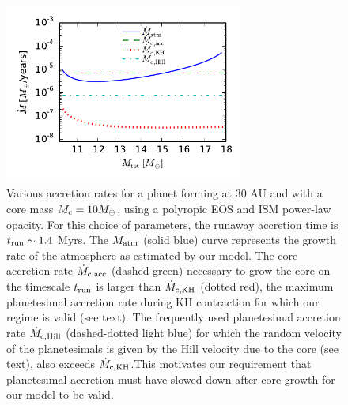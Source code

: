  \begin{figure}[H]
\centering
\includegraphics[width=0.7\textwidth]{figures/acc_rates_paper.pdf}
\caption{Various accretion rates for a planet forming at 30 AU and with a core mass $M_{\rm c}=10 M_{\oplus}$, using a polyropic EOS and ISM power-law opacity. For this choice of parameters, the runaway accretion time is $t_{\rm run} \sim 1.4$ Myrs. The $\dot{M}_{\rm{atm}}$ (solid blue) curve represents the growth rate of the atmosphere as estimated by our model. The core accretion rate $\dot{M}_{\rm c, acc}$ (dashed green) necessary to grow the core on the timescale $t_{\rm run}$ is larger than $\dot{M}_{\rm c, KH}$ (dotted red), the maximum planetesimal accretion rate during KH contraction for which our regime is valid (see text). The frequently used planetesimal accretion rate $\dot{M}_{\rm c, Hill}$ (dashed-dotted light blue) for which the random velocity of the planetesimals is given by the Hill velocity due to the core (see text), also exceeds $\dot{M}_{\rm c, KH}$.This motivates our requirement  that planetesimal accretion must have slowed down after core growth for our model to be valid.}

\label{fig:accrates}
\end{figure}


